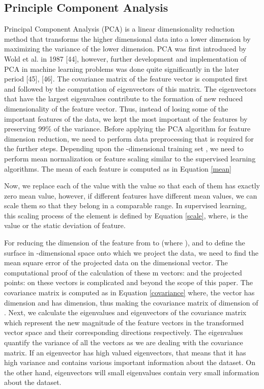 \documentclass{llncs}
\begin{document}
\subsection{Principle Component Analysis}
Principal Component Analysis (PCA) is a linear dimensionality reduction method that transforms the higher dimensional data into a lower dimension by maximizing the variance of the lower dimension. PCA was first introduced by Wold et al. in 1987 [44], however, further development and implementation of PCA in machine learning problems was done quite significantly in the later period [45], [46]. The covariance matrix of the feature vector is computed first and followed by the computation of eigenvectors of this matrix. The eigenvectors that have the largest eigenvalues contribute to the formation of new reduced dimensionality of the feature vector. Thus, instead of losing some of the important features of the data, we kept the most important of the features by preserving 99\% of the variance.
Before applying the PCA algorithm for feature dimension reduction, we need to perform data preprocessing that is required for the further steps. Depending upon the -dimensional training set , we need to perform mean normalization or feature scaling similar to the supervised learning algorithms. The mean of each feature is computed as in Equation \ref{mean}

Now, we replace each of the  value with the  value so that each of them has exactly zero mean value, however, if different features have different mean values, we can scale them so that they belong in a comparable range. In supervised learning, this scaling process of the  element is defined by Equation \ref{scale}, where,  is the  value or the static deviation of  feature.

For reducing the dimension of the feature from  to  (where ), and to define the surface in -dimensional space onto which we project the data, we need to find the mean square error of the projected data on the  dimensional vector. The computational proof of the calculation of these m vectors:  and the projected points:  on these vectors is complicated and beyond the scope of this paper. The covariance matrix is computed as in Equation \ref{covariance} where, the  vector has  dimension and  has  dimension, thus making the covariance matrix of dimension of . Next, we calculate the eigenvalues and eigenvectors of the covariance matrix which represent the new magnitude of the feature vectors in the transformed vector space and their corresponding directions respectively.  The eigenvalues quantify the variance of all the vectors as we are dealing with the covariance matrix. If an eigenvector has high valued eigenvectors, that means that it has high variance and contains various important information about the dataset. On the other hand, eigenvectors will small eigenvalues contain very small information about the dataset.
\end{document}

